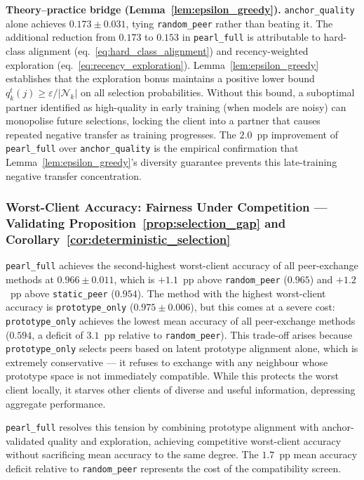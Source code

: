 \documentclass[conference]{IEEEtran}
\begin{document}
\textbf{Theory--practice bridge (Lemma~\ref{lem:epsilon_greedy}).}
\texttt{anchor\_quality} alone achieves $0.173\pm0.031$, tying \texttt{random\_peer} rather than beating it. The additional reduction from $0.173$ to $0.153$ in \texttt{pearl\_full} is attributable to hard-class alignment (eq.~\eqref{eq:hard_class_alignment}) and recency-weighted exploration (eq.~\eqref{eq:recency_exploration}). Lemma~\ref{lem:epsilon_greedy} establishes that the exploration bonus maintains a positive lower bound $q_k^t(j) \geq \varepsilon/|\mathcal{N}_k|$ on all selection probabilities. Without this bound, a suboptimal partner identified as high-quality in early training (when models are noisy) can monopolise future selections, locking the client into a partner that causes repeated negative transfer as training progresses. The $2.0$~pp improvement of \texttt{pearl\_full} over \texttt{anchor\_quality} is the empirical confirmation that Lemma~\ref{lem:epsilon_greedy}'s diversity guarantee prevents this late-training negative transfer concentration.

\subsubsection{Worst-Client Accuracy: Fairness Under Competition — Validating Proposition~\ref{prop:selection_gap} and Corollary~\ref{cor:deterministic_selection}}
\label{subsubsec:official-worst}

\texttt{pearl\_full} achieves the second-highest worst-client accuracy of all peer-exchange methods at $0.966\pm0.011$, which is $+1.1$~pp above \texttt{random\_peer} ($0.965$) and $+1.2$~pp above \texttt{static\_peer} ($0.954$). The method with the highest worst-client accuracy is \texttt{prototype\_only} ($0.975\pm0.006$), but this comes at a severe cost: \texttt{prototype\_only} achieves the lowest mean accuracy of all peer-exchange methods ($0.594$, a deficit of $3.1$~pp relative to \texttt{random\_peer}). This trade-off arises because \texttt{prototype\_only} selects peers based on latent prototype alignment alone, which is extremely conservative --- it refuses to exchange with any neighbour whose prototype space is not immediately compatible. While this protects the worst client locally, it starves other clients of diverse and useful information, depressing aggregate performance.

\texttt{pearl\_full} resolves this tension by combining prototype alignment with anchor-validated quality and exploration, achieving competitive worst-client accuracy without sacrificing mean accuracy to the same degree. The $1.7$~pp mean accuracy deficit relative to \texttt{random\_peer} represents the cost of the compatibility screen.
\end{document}
